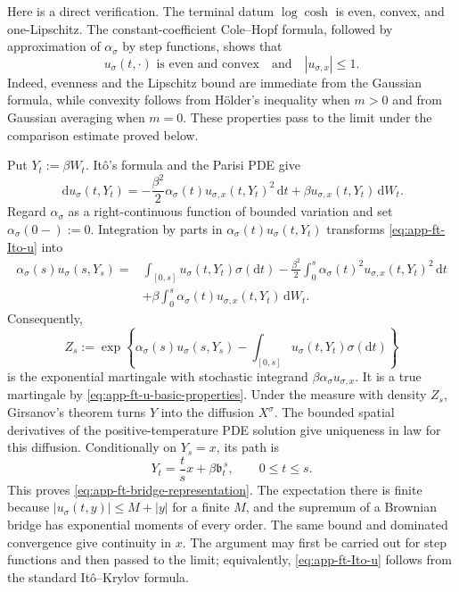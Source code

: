 \documentclass[10pt]{amsart}
\theoremstyle{definition}
\theoremstyle{remark}
\numberwithin{equation}{section}
\newcommand{\1}{\mathbf 1}
\newcommand{\dd}{\,\mathrm d}
\begin{document}
Here is a direct verification.  The terminal datum $\log\cosh$ is even, convex, and one-Lipschitz.  The constant-coefficient Cole--Hopf formula, followed by approximation of $\alpha_\sigma$ by step functions, shows that
\begin{equation}
 u_\sigma(t,\cdot)\text{ is even and convex}
 \quad\text{and}\quad |u_{\sigma,x}|\leq1.
 \label{eq:app-ft-u-basic-properties}
\end{equation}
Indeed, evenness and the Lipschitz bound are immediate from the Gaussian formula, while convexity follows from H\"older's inequality when $m>0$ and from Gaussian averaging when $m=0$. These properties pass to the limit under the comparison estimate proved below.

Put $Y_t:=\beta W_t$.  It\^o's formula and the Parisi PDE give
\begin{equation}
 \dd u_\sigma(t,Y_t)
 =-\frac{\beta^2}{2}\alpha_\sigma(t)
   u_{\sigma,x}(t,Y_t)^2\dd t
 +\beta u_{\sigma,x}(t,Y_t)\dd W_t.
 \label{eq:app-ft-Ito-u}
\end{equation}
Regard $\alpha_\sigma$ as a right-continuous function of bounded variation and set $\alpha_\sigma(0-):=0$.  Integration by parts in $\alpha_\sigma(t)u_\sigma(t,Y_t)$ transforms \eqref{eq:app-ft-Ito-u} into
\begin{align*}
 \alpha_\sigma(s)u_\sigma(s,Y_s)
 ={}&\int_{[0,s]}u_\sigma(t,Y_t)\sigma(\mathrm d t)
 -\frac{\beta^2}{2}\int_0^s\alpha_\sigma(t)^2
 u_{\sigma,x}(t,Y_t)^2\dd t\\
 &+\beta\int_0^s\alpha_\sigma(t)
 u_{\sigma,x}(t,Y_t)\dd W_t.
\end{align*}
Consequently,
\begin{equation*}
 Z_s:=\exp\left\{
 \alpha_\sigma(s)u_\sigma(s,Y_s)
 -\int_{[0,s]}u_\sigma(t,Y_t)\sigma(\mathrm d t)
 \right\}
\end{equation*}
is the exponential martingale with stochastic integrand $\beta\alpha_\sigma u_{\sigma,x}$.  It is a true martingale by \eqref{eq:app-ft-u-basic-properties}.  Under the measure with density $Z_s$, Girsanov's theorem turns $Y$ into the diffusion $X^\sigma$. The bounded spatial derivatives of the positive-temperature PDE solution give uniqueness in law for this diffusion. Conditionally on $Y_s=x$, its path is
\begin{equation*}
 Y_t=\frac tsx+\beta\mathfrak b_t^{\,s},
 \qquad 0\leq t\leq s.
\end{equation*}
This proves \eqref{eq:app-ft-bridge-representation}.  The expectation there is finite because $|u_\sigma(t,y)|\leq M+|y|$ for a finite $M$, and the supremum of a Brownian bridge has exponential moments of every order.  The same bound and dominated convergence give continuity in $x$.  The argument may first be carried out for step functions and then passed to the limit; equivalently, \eqref{eq:app-ft-Ito-u} follows from the standard It\^o--Krylov formula.
\end{document}
